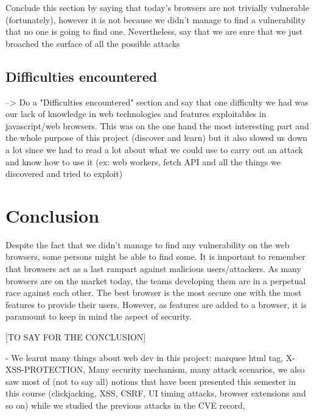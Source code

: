 \documentclass[journal]{IEEEtran}
\begin{document}
Conclude this section by saying that today's browsers are not trivially vulnerable (fortunately), however it is not because we didn't manage to find a vulnerability that no one is going to find one. 
Nevertheless, say that we are sure that we just broached the surface of all the possible attacks 

\subsection{Difficulties encountered}

--> Do a "Difficulties encountered" section and say that one difficulty we had was our lack of knowledge in web technologies and features exploitables in javascript/web browsers. This was on the one hand the most interesting part and the whole purpose of this project (discover and learn) but it also slowed us down a lot since we had to read a lot about what we could use to carry out an attack and know how to use it (ex: web workers, fetch API and all the things we discovered and tried to exploit)


\section{Conclusion}
Despite the fact that we didn't manage to find any vulnerability on the web browsers, some persons might be able to find some. It is important to remember that browsers act as a last rampart against malicious users/attackers. As many browsers are on the market today, the teams developing them are in a perpetual race against each other. The best browser is the most secure one with the most features to provide their users. However, as features are added to a browser, it is paramount to keep in mind the aspect of security.

[TO SAY FOR THE CONCLUSION]

- We learnt many things about web dev in this project: marquee html tag, X-XSS-PROTECTION, Many security mechanism, many attack scenarios, we also saw most of (not to say all) notions that have been presented this semester in this course (clickjacking, XSS, CSRF, UI timing attacks, browser extensions and so on) while we studied the previous attacks in the CVE record,
\end{document}
